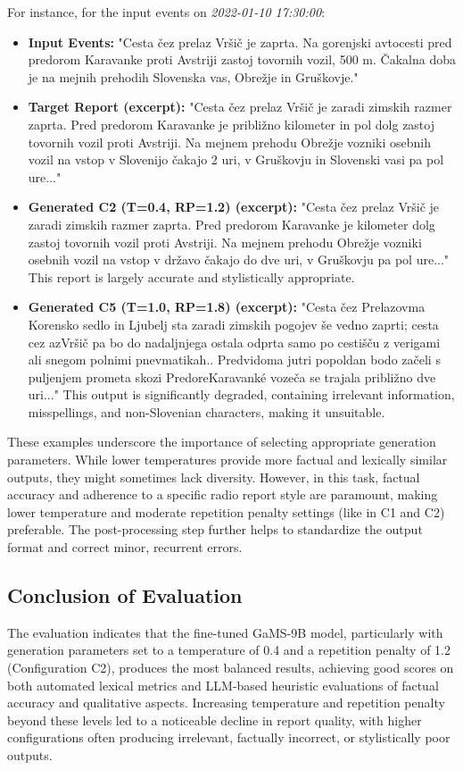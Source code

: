 \documentclass[fleqn,moreauthors,10pt]{ds_report}
\begin{document}
For instance, for the input events on \textit{2022-01-10 17:30:00}:
\begin{itemize}
    \item \textbf{Input Events:} "Cesta čez prelaz Vršič je zaprta. Na gorenjski avtocesti pred predorom Karavanke proti Avstriji zastoj tovornih vozil, 500 m. Čakalna doba je na mejnih prehodih Slovenska vas, Obrežje in Gruškovje."
    \item \textbf{Target Report (excerpt):} "Cesta čez prelaz Vršič je zaradi zimskih razmer zaprta. Pred predorom Karavanke je približno kilometer in pol dolg zastoj tovornih vozil proti Avstriji. Na mejnem prehodu Obrežje vozniki osebnih vozil na vstop v Slovenijo čakajo 2 uri, v Gruškovju in Slovenski vasi pa pol ure..."
    \item \textbf{Generated C2 (T=0.4, RP=1.2) (excerpt):} "Cesta čez prelaz Vršič je zaradi zimskih razmer zaprta. Pred predorom Karavanke je kilometer dolg zastoj tovornih vozil proti Avstriji. Na mejnem prehodu Obrežje vozniki osebnih vozil na vstop v državo čakajo do dve uri, v Gruškovju pa pol ure..." This report is largely accurate and stylistically appropriate.
    \item \textbf{Generated C5 (T=1.0, RP=1.8) (excerpt):} "Cesta čez Prelazovma Korensko sedlo in Ljubelj sta zaradi zimskih pogojev še vedno zaprti; cesta cez azVršič pa bo do nadaljnjega ostala odprta samo po cestišču z verigami ali snegom polnimi pnevmatikah.. Predvidoma jutri popoldan bodo začeli s puljenjem prometa skozi PredoreKaravanké vozeča se trajala približno dve uri..." This output is significantly degraded, containing irrelevant information, misspellings, and non-Slovenian characters, making it unsuitable.
\end{itemize}
These examples underscore the importance of selecting appropriate generation parameters. While lower temperatures provide more factual and lexically similar outputs, they might sometimes lack diversity. However, in this task, factual accuracy and adherence to a specific radio report style are paramount, making lower temperature and moderate repetition penalty settings (like in C1 and C2) preferable. The post-processing step further helps to standardize the output format and correct minor, recurrent errors.

\subsection*{Conclusion of Evaluation}
The evaluation indicates that the fine-tuned GaMS-9B model, particularly with generation parameters set to a temperature of 0.4 and a repetition penalty of 1.2 (Configuration C2), produces the most balanced results, achieving good scores on both automated lexical metrics and LLM-based heuristic evaluations of factual accuracy and qualitative aspects. Increasing temperature and repetition penalty beyond these levels led to a noticeable decline in report quality, with higher configurations often producing irrelevant, factually incorrect, or stylistically poor outputs.
\end{document}
